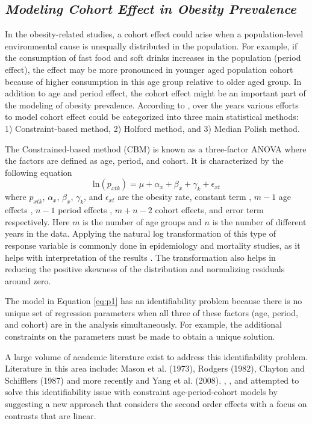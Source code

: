 \documentclass[11pt,letterpaper]{article}
\numberwithin{equation}{section}
\begin{document}
\subsection{\textit{Modeling Cohort Effect in Obesity Prevalence}}

In the obesity-related studies, a cohort effect could arise when a population-level environmental cause is unequally distributed in the population. For example, if the consumption of fast food and soft drinks increases in the population (period effect), the effect may be more pronounced in younger aged population cohort because of higher consumption in this age group relative to older aged group. In addition to age and period effect, the cohort effect might be an important part of the modeling of obesity prevalence. According to \cite{Keyes+Utz+Robinson+Li:2010}, over the years various efforts to model cohort effect could be categorized into three main statistical methods: 1) Constraint-based method, 2) Holford method, and 3) Median Polish method.

The Constrained-based method (CBM) is known as a three-factor ANOVA where the factors are defined as age, period, and cohort. It is characterized by the following equation
\begin{equation}\label{eq:p1}
\text{ln}(p_{xtk})=\mu + \alpha_{x} + \beta_{x} + \gamma_{k} + \epsilon_{xt}
\end{equation}
where $p_{xtk}$, $\alpha_{x}$, $\beta_{x}$, $\gamma_{k}$, and $\epsilon_{xt}$ are the obesity rate, constant term , $m-1$ age effects , $n-1$ period effects , $m+n-2$ cohort effects, and error term respectively. Here $m$ is the number of age groups and $n$ is the number of different years in the data. Applying the natural log transformation of this type of response variable is commonly done in epidemiology and mortality studies, as it helps with interpretation of the results \citep{Keyes+Li:2010}. The transformation also helps in reducing the positive skewness of the distribution and normalizing residuals around zero.

The model in Equation \ref{eq:p1} has an identifiability problem because there is no unique set of
regression parameters when all three of these factors (age, period, and cohort) are in the analysis
simultaneously. For example, the additional constraints on the parameters must be made to obtain a unique solution.

A large volume of academic literature exist to address this identifiability problem. Literature in this area include: Mason et al. (1973), Rodgers (1982), Clayton  and Schifflers (1987) and more recently \cite{Glenn:2005} and Yang et al. (2008). \cite{Holford:1983}, \cite{Holford:1991}, and \cite{Holford:1992} attempted to solve this identifiability issue with constraint age-period-cohort models by suggesting a new approach that considers the second order effects with a focus on contrasts that are linear.
\end{document}
